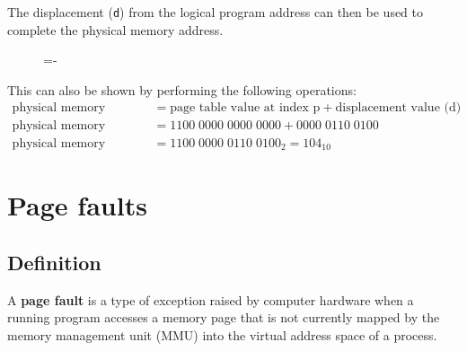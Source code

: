 \documentclass[a4paper]{systems-software}
\begin{document}
The displacement (\texttt{d}) from the logical program address can then be used to complete the physical memory address.

\begin{figure}[H]
  \lineskip=-\fboxrule
\end{figure}

This can also be shown by performing the following operations:
\begin{equation*}
	\begin{aligned}
		\text{physical memory address} & = \text{page table value at index p} + \text{displacement value (d)} \\
		\text{physical memory address} & = 1100\;0000\;0000\;0000 + 0000\;0110\;0100 \\
		\text{physical memory address} & = 1100\;0000\;0110\;0100_{2} = 104_{10}
	\end{aligned}
\end{equation*}


\section*{Page faults}

\subsection*{Definition}

A \textbf{page fault} is a type of exception raised by computer hardware when a running program accesses a memory page that is not currently mapped by the memory management unit (MMU) into the virtual address space of a process.
\end{document}
